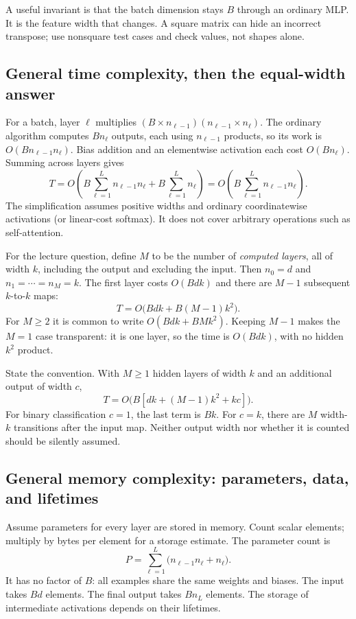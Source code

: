 A useful invariant is that the batch dimension stays $B$ through an ordinary MLP. It is the feature width that changes. A square matrix can hide an incorrect transpose; use nonsquare test cases and check values, not shapes alone.

\subsection{General time complexity, then the equal-width answer}
For a batch, layer $\ell$ multiplies $(B\times n_{\ell-1})(n_{\ell-1}\times n_\ell)$. The ordinary algorithm computes $Bn_\ell$ outputs, each using $n_{\ell-1}$ products, so its work is $O(Bn_{\ell-1}n_\ell)$. Bias addition and an elementwise activation each cost $O(Bn_\ell)$. Summing across layers gives
\[
 T=O\!\left(B\sum_{\ell=1}^L n_{\ell-1}n_\ell
             +B\sum_{\ell=1}^L n_\ell\right)
  =O\!\left(B\sum_{\ell=1}^L n_{\ell-1}n_\ell\right).
\]
The simplification assumes positive widths and ordinary coordinatewise activations (or linear-cost softmax). It does not cover arbitrary operations such as self-attention.

For the lecture question, define $M$ to be the number of \emph{computed layers}, all of width $k$, including the output and excluding the input. Then $n_0=d$ and $n_1=\cdots=n_M=k$. The first layer costs $O(Bdk)$ and there are $M-1$ subsequent $k$-to-$k$ maps:
\[
 \boxed{T=O\bigl(Bdk+B(M-1)k^2\bigr).}
\]
For $M\geq2$ it is common to write $O(Bdk+BMk^2)$. Keeping $M-1$ makes the $M=1$ case transparent: it is one layer, so the time is $O(Bdk)$, with no hidden $k^2$ product.

\begin{keyidea}
State the convention. With $M\geq1$ hidden layers of width $k$ and an additional output of width $c$,
\[
 T=O\bigl(B[dk+(M-1)k^2+kc]\bigr).
\]
For binary classification $c=1$, the last term is $Bk$. For $c=k$, there are $M$ width-$k$ transitions after the input map. Neither output width nor whether it is counted should be silently assumed.
\end{keyidea}

\subsection{General memory complexity: parameters, data, and lifetimes}
Assume parameters for every layer are stored in memory. Count scalar elements; multiply by bytes per element for a storage estimate. The parameter count is
\[
 P=\sum_{\ell=1}^L\bigl(n_{\ell-1}n_\ell+n_\ell\bigr).
\]
It has no factor of $B$: all examples share the same weights and biases. The input takes $Bd$ elements. The final output takes $Bn_L$ elements. The storage of intermediate activations depends on their lifetimes.

